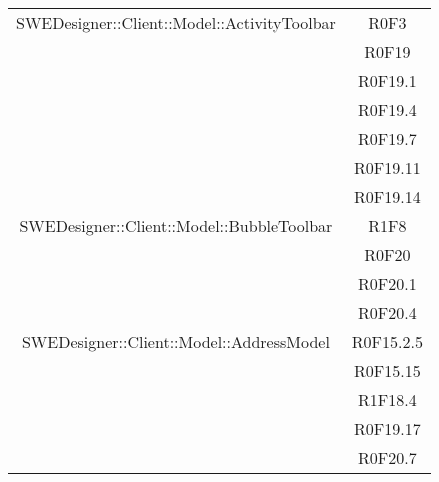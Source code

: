 \documentclass[../SpecificaTecnica.tex]{subfiles}
\begin{document}
\begin{longtable}{|c|c|}
		SWEDesigner::Client::Model::ActivityToolbar & {R0F3}\\&{R0F19}\\&{R0F19.1}\\&{R0F19.4}\\&{R0F19.7}\\&{R0F19.11}\\&{R0F19.14} \\\hline
		
		SWEDesigner::Client::Model::BubbleToolbar & {R1F8}\\&{R0F20}\\&{R0F20.1}\\&{R0F20.4}\\\hline
		
		SWEDesigner::Client::Model::AddressModel & {R0F15.2.5}\\&{R0F15.15}\\&{R1F18.4}\\&{R0F19.17}\\&{R0F20.7}\\\hline
		

\end{longtable}
\end{document}
